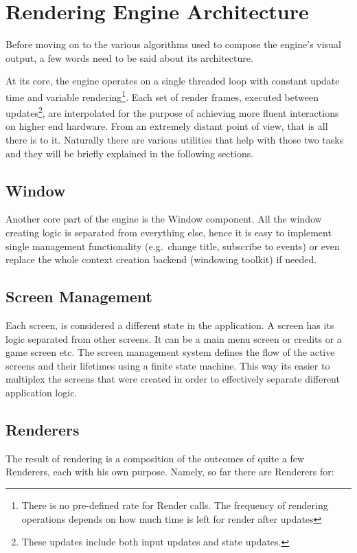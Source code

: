\section{Rendering Engine Architecture}
Before moving on to the various algorithms used to compose the engine's visual output, a few
words need to be said about its architecture.

At its core, the engine operates on a single threaded loop with constant update time and
variable rendering\footnote{There is no pre-defined rate for Render calls. The frequency of
rendering operations depends on how much time is left for render after updates}.
Each set of render frames, executed between updates\footnote{These updates include both input
updates and state updates.}, are interpolated for the purpose of achieving more fluent interactions
on higher end hardware. From an extremely distant point of view, that is all there is to it.
Naturally there are various utilities that help with those two tasks and they will be briefly
explained in the following sections.

\subsection{Window}
Another core part of the engine is the Window component. All the window creating logic
is separated from everything else, hence it is easy to implement single management functionality
(e.g.\ change title, subscribe to events) or even replace the whole context creation backend
(windowing toolkit) if needed.

\subsection{Screen Management}
Each screen, is considered a different state in the application. A screen has its logic separated
from other screens. It can be a main menu screen or credits or a game screen etc. The screen management
system defines the flow of the active screens and their lifetimes using a finite state machine. This
way its easier to multiplex the screens that were created in order to effectively separate different
application logic.

\subsection{Renderers}
The result of rendering is a composition of the outcomes of quite a few Renderers, each
with his own purpose. Namely, so far there are Renderers for:

